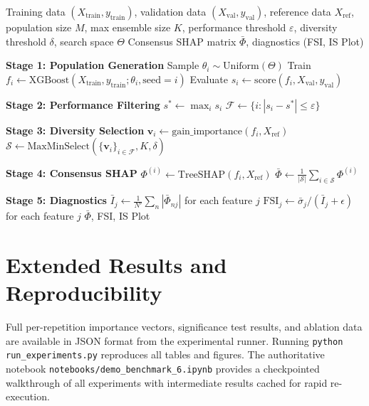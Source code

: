 \documentclass[11pt]{article}
\begin{document}
\begin{algorithm}[htbp]
\caption{DASH Pipeline}
\label{alg:dash}
\begin{algorithmic}[1]
\REQUIRE Training data $(X_{\text{train}}, y_{\text{train}})$, validation
  data $(X_{\text{val}}, y_{\text{val}})$, reference data $X_{\text{ref}}$,
  population size $M$, max ensemble size $K$, performance threshold
  $\varepsilon$, diversity threshold $\delta$, search space $\Theta$
\ENSURE Consensus SHAP matrix $\bar{\Phi}$, diagnostics (FSI, IS Plot)

\STATE \textbf{Stage 1: Population Generation}
  \STATE Sample $\theta_i \sim \text{Uniform}(\Theta)$
  \STATE Train $f_i \gets \text{XGBoost}(X_{\text{train}}, y_{\text{train}};
    \theta_i, \text{seed}=i)$
  \STATE Evaluate $s_i \gets \text{score}(f_i, X_{\text{val}}, y_{\text{val}})$
\ENDFOR

\STATE \textbf{Stage 2: Performance Filtering}
\STATE $s^* \gets \max_i s_i$
\STATE $\mathcal{F} \gets \{i : |s_i - s^*| \leq \varepsilon\}$

\STATE \textbf{Stage 3: Diversity Selection}
  \STATE $\mathbf{v}_i \gets \text{gain\_importance}(f_i, X_{\text{ref}})$
\ENDFOR
\STATE $\mathcal{S} \gets \text{MaxMinSelect}(\{\mathbf{v}_i\}_{i \in \mathcal{F}},
  K, \delta)$

\STATE \textbf{Stage 4: Consensus SHAP}
  \STATE $\Phi^{(i)} \gets \text{TreeSHAP}(f_i, X_{\text{ref}})$
\ENDFOR
\STATE $\bar{\Phi} \gets \frac{1}{|\mathcal{S}|} \sum_{i \in \mathcal{S}}
  \Phi^{(i)}$

\STATE \textbf{Stage 5: Diagnostics}
\STATE $\bar{I}_j \gets \frac{1}{N'}\sum_n |\bar{\Phi}_{nj}|$ for each
  feature $j$
\STATE $\text{FSI}_j \gets \bar{\sigma}_j / (\bar{I}_j + \epsilon)$ for
  each feature $j$
\RETURN $\bar{\Phi}$, FSI, IS Plot
\end{algorithmic}
\end{algorithm}

\section{Extended Results and Reproducibility}
\label{app:full_sweep}

Full per-repetition importance vectors, significance test results, and
ablation data are available in JSON format from the experimental runner.
Running \texttt{python run\_experiments.py} reproduces all tables and
figures. The authoritative notebook
\texttt{notebooks/demo\_benchmark\_6.ipynb} provides a checkpointed
walkthrough of all experiments with intermediate results cached for
rapid re-execution.
\end{document}
